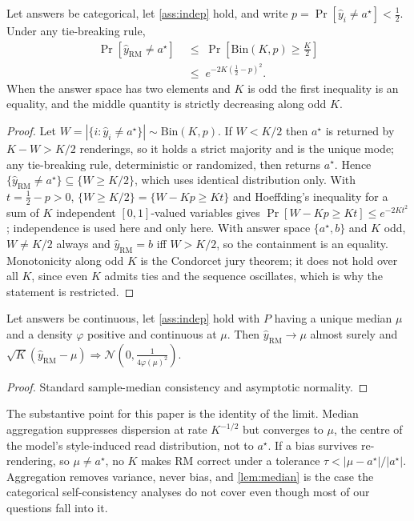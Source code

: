 \documentclass[11pt]{article}
\newcommand{\rmg}{\mathrm{RM}}
\begin{document}
\begin{lemma}
\label{lem:mode}
Let answers be categorical, let \cref{ass:indep} hold, and write $p = \Pr[\hat y_i \neq a^\star] < \tfrac12$. Under any tie-breaking rule,
\begin{equation*}
\begin{split}
\Pr[\hat y_{\rmg} \neq a^\star] \;&\le\; \Pr[\mathrm{Bin}(K,p) \ge \tfrac{K}{2}]\\
&\le\; e^{-2K(\frac12 - p)^2}.
\end{split}
\end{equation*}
When the answer space has two elements and $K$ is odd the first inequality is an equality, and the middle quantity is strictly decreasing along odd $K$.
\end{lemma}

\begin{proof}
Let $W = |\{i : \hat y_i \neq a^\star\}| \sim \mathrm{Bin}(K,p)$. If $W < K/2$ then $a^\star$ is returned by $K-W > K/2$ renderings, so it holds a strict majority and is the unique mode; any tie-breaking rule, deterministic or randomized, then returns $a^\star$. Hence $\{\hat y_{\rmg} \neq a^\star\} \subseteq \{W \ge K/2\}$, which uses identical distribution only. With $t = \tfrac12 - p > 0$, $\{W \ge K/2\} = \{W - Kp \ge Kt\}$ and Hoeffding's inequality for a sum of $K$ independent $[0,1]$-valued variables gives $\Pr[W - Kp \ge Kt] \le e^{-2Kt^2}$; independence is used here and only here. With answer space $\{a^\star,b\}$ and $K$ odd, $W \neq K/2$ always and $\hat y_{\rmg} = b$ iff $W > K/2$, so the containment is an equality. Monotonicity along odd $K$ is the Condorcet jury theorem; it does not hold over all $K$, since even $K$ admits ties and the sequence oscillates, which is why the statement is restricted.
\end{proof}

\begin{lemma}
\label{lem:median}
Let answers be continuous, let \cref{ass:indep} hold with $P$ having a unique median $\mu$ and a density $\varphi$ positive and continuous at $\mu$. Then $\hat y_{\rmg} \to \mu$ almost surely and $\sqrt{K}(\hat y_{\rmg} - \mu) \Rightarrow \mathcal{N}(0, \tfrac{1}{4\varphi(\mu)^2})$.
\end{lemma}

\begin{proof}
Standard sample-median consistency and asymptotic normality.
\end{proof}

The substantive point for this paper is the identity of the limit. Median aggregation suppresses dispersion at rate $K^{-1/2}$ but converges to $\mu$, the centre of the model's style-induced read distribution, not to $a^\star$. If a bias survives re-rendering, so $\mu \neq a^\star$, no $K$ makes $\rmg$ correct under a tolerance $\tau < |\mu - a^\star|/|a^\star|$. Aggregation removes variance, never bias, and \cref{lem:median} is the case the categorical self-consistency analyses do not cover even though most of our questions fall into it.
\end{document}

